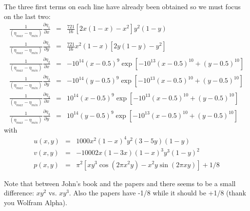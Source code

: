 The three first terms on each line have already been obtained so we 
must focus on the last two:
\begin{eqnarray}
\frac{1}{(\eta_{max}-\eta_{min})}\frac{\partial \eta_1}{\partial x} 
&=& \frac{721}{16} [2x(1-x)-x^2] y^2(1-y)\\
\frac{1}{(\eta_{max}-\eta_{min})}\frac{\partial \eta_1}{\partial y} 
&=& \frac{721}{16} x^2 (1-x)[2y(1-y)-y^2]\\
\frac{1}{(\eta_{max}-\eta_{min})}\frac{\partial \eta_2}{\partial x} 
&=& -10^{14} (x-0.5)^{9} \exp [  -10^{13} (x-0.5)^{10} + (y-0.5)^{10}  ] \\
\frac{1}{(\eta_{max}-\eta_{min})}\frac{\partial \eta_2}{\partial y} 
&=& -10^{14} (y-0.5)^{9} \exp [  -10^{13} (x-0.5)^{10} + (y-0.5)^{10}  ] \\
\frac{1}{(\eta_{max}-\eta_{min})}\frac{\partial \eta_3}{\partial x} 
&=& 10^{14} (x-0.5)^{9} \exp [  -10^{13} (x-0.5)^{10} + (y-0.5)^{10}  ] \\
\frac{1}{(\eta_{max}-\eta_{min})}\frac{\partial \eta_3}{\partial y} 
&=& 10^{14} (y-0.5)^{9} \exp [  -10^{13} (x-0.5)^{10} + (y-0.5)^{10}  ] 
\end{eqnarray}
with 
\begin{eqnarray}
u(x,y) &=&  1000 x^2(1-x)^4  y^2 (3-5y) (1-y) \\
v(x,y) &=& -1000 2x(1-3x) (1-x)^3  y^3(1-y)^2 \\
p(x,y) &=& \pi^2 [xy^3 \cos(2\pi x^2 y) - x^2y \sin(2\pi xy) ]+1/8
\end{eqnarray}

Note that between John's book and the papers \cite{jokn16b} and \cite{jokn18}
there seems to be a small difference: $xy^2$ vs. $xy^3$.
Also the papers have -1/8 while it should be +1/8 (thank you Wolfram Alpha).
